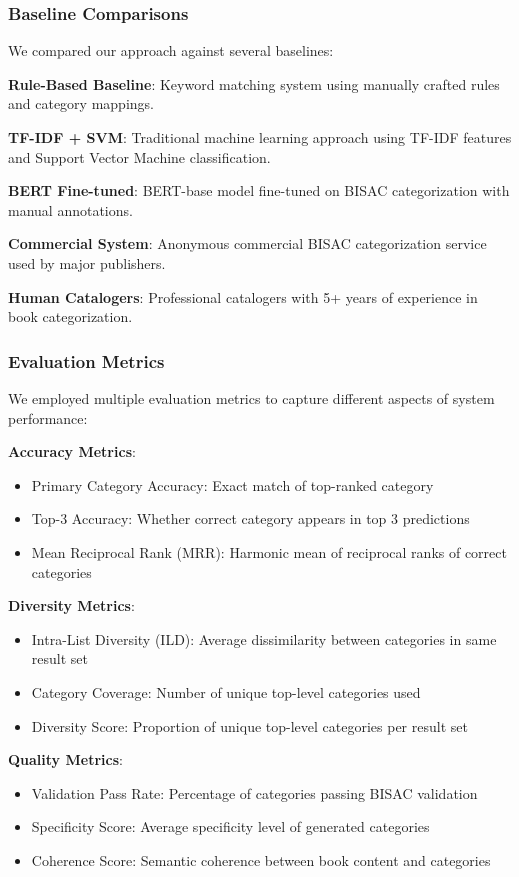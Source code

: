 \documentclass{article}
\begin{document}
\subsubsection{Baseline Comparisons}

We compared our approach against several baselines:

\textbf{Rule-Based Baseline}: Keyword matching system using manually crafted rules and category mappings.

\textbf{TF-IDF + SVM}: Traditional machine learning approach using TF-IDF features and Support Vector Machine classification.

\textbf{BERT Fine-tuned}: BERT-base model fine-tuned on BISAC categorization with manual annotations.

\textbf{Commercial System}: Anonymous commercial BISAC categorization service used by major publishers.

\textbf{Human Catalogers}: Professional catalogers with 5+ years of experience in book categorization.

\subsubsection{Evaluation Metrics}

We employed multiple evaluation metrics to capture different aspects of system performance:

\textbf{Accuracy Metrics}:
\begin{itemize}
\item Primary Category Accuracy: Exact match of top-ranked category
\item Top-3 Accuracy: Whether correct category appears in top 3 predictions
\item Mean Reciprocal Rank (MRR): Harmonic mean of reciprocal ranks of correct categories
\end{itemize}

\textbf{Diversity Metrics}:
\begin{itemize}
\item Intra-List Diversity (ILD): Average dissimilarity between categories in same result set
\item Category Coverage: Number of unique top-level categories used
\item Diversity Score: Proportion of unique top-level categories per result set
\end{itemize}

\textbf{Quality Metrics}:
\begin{itemize}
\item Validation Pass Rate: Percentage of categories passing BISAC validation
\item Specificity Score: Average specificity level of generated categories
\item Coherence Score: Semantic coherence between book content and categories
\end{itemize}
\end{document}
